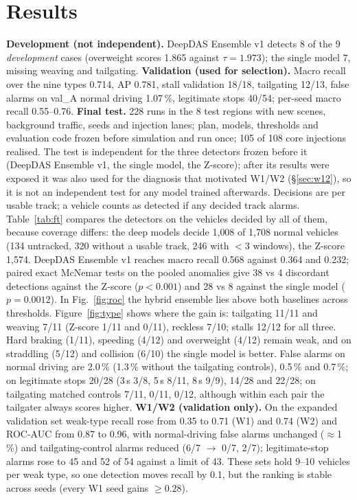 \documentclass[10pt,a4paper,twocolumn]{article}
\newcommand{\EDIV}{DeepDAS Ensemble v1}\newcommand{\dev}{\textit{development}}\newcommand{\val}{\textit{validation}}\newcommand{\ft}{\textit{final test}}
\begin{document}
\section{Results}
\textbf{Development (not independent).} \EDIV{} detects 8 of the 9 \dev{} cases (overweight scores 1.865 against $\tau=1.973$); the single model 7, missing weaving and tailgating.
\textbf{Validation (used for selection).} Macro recall over the nine types 0.714, AP 0.781, stall validation 18/18, tailgating 12/13, false alarms on val\_A normal driving 1.07\,\%, legitimate stops 40/54; per-seed macro recall 0.55--0.76.
\textbf{Final test.} 228 runs in the 8 test regions with new scenes, background traffic, seeds and injection lanes; plan, models, thresholds and evaluation code frozen before simulation and run once; 105 of 108 core injections realised. The test is independent for the three detectors frozen before it (\EDIV, the single model, the Z-score); after its results were exposed it was also used for the diagnosis that motivated W1/W2 (\S\ref{sec:w12}), so it is not an independent test for any model trained afterwards. Decisions are per usable track; a vehicle counts as detected if any decided track alarms. Table~\ref{tab:ft} compares the detectors on the vehicles decided by all of them, because coverage differs: the deep models decide 1{,}008 of 1{,}708 normal vehicles (134 untracked, 320 without a usable track, 246 with $<3$ windows), the Z-score 1{,}574. \EDIV{} reaches macro recall 0.568 against 0.364 and 0.232; paired exact McNemar tests on the pooled anomalies give 38 vs 4 discordant detections against the Z-score ($p<0.001$) and 28 vs 8 against the single model ($p=0.0012$). In Fig.~\ref{fig:roc} the hybrid ensemble lies above both baselines across thresholds. Figure~\ref{fig:type} shows where the gain is: tailgating 11/11 and weaving 7/11 (Z-score 1/11 and 0/11), reckless 7/10; stalls 12/12 for all three. Hard braking (1/11), speeding (4/12) and overweight (4/12) remain weak, and on straddling (5/12) and collision (6/10) the single model is better. False alarms on normal driving are 2.0\,\% (1.3\,\% without the tailgating controls), 0.5\,\% and 0.7\,\%; on legitimate stops 20/28 (3\,s 3/8, 5\,s 8/11, 8\,s 9/9), 14/28 and 22/28; on tailgating matched controls 7/11, 0/11, 0/12, although within each pair the tailgater always scores higher.
\textbf{W1/W2 (validation only).} On the expanded validation set weak-type recall rose from 0.35 to 0.71 (W1) and 0.74 (W2) and ROC-AUC from 0.87 to 0.96, with normal-driving false alarms unchanged ($\approx$1\,\%) and tailgating-control alarms reduced (6/7 $\to$ 0/7, 2/7); legitimate-stop alarms rose to 45 and 52 of 54 against a limit of 43. These sets hold 9--10 vehicles per weak type, so one detection moves recall by 0.1, but the ranking is stable across seeds (every W1 seed gains $\ge0.28$).
\end{document}
